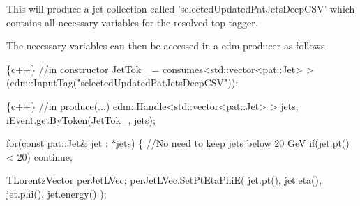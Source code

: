 This will produce a jet collection called 'selected\-Updated\-Pat\-Jets\-Deep\-C\-S\-V' which contains all necessary variables for the resolved top tagger.

The necessary variables can then be accessed in a edm producer as follows


\begin{DoxyCode}
\{c++\}
\textcolor{comment}{//in constructor}
JetTok\_ = consumes<std::vector<pat::Jet> >(edm::InputTag(\textcolor{stringliteral}{"selectedUpdatedPatJetsDeepCSV"}));
\end{DoxyCode}



\begin{DoxyCode}
\{c++\}
\textcolor{comment}{//in produce(...)}
edm::Handle<std::vector<pat::Jet> > jets;
iEvent.getByToken(JetTok\_, jets);

\textcolor{keywordflow}{for}(\textcolor{keyword}{const} pat::Jet& jet : *jets)
\{
    \textcolor{comment}{//No need to keep jets below 20 GeV}
    \textcolor{keywordflow}{if}(jet.pt() < 20) \textcolor{keywordflow}{continue};

    TLorentzVector perJetLVec;
    perJetLVec.SetPtEtaPhiE( jet.pt(), jet.eta(), jet.phi(), jet.energy() );


\end{DoxyCode}
